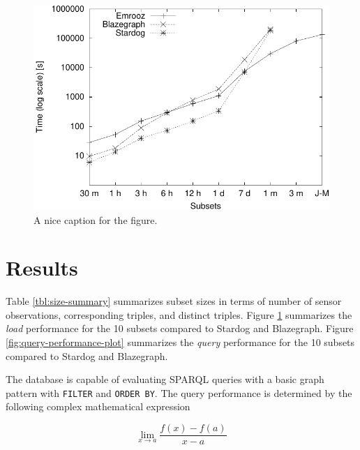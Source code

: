 \documentclass[preprint,12pt,authoryear]{elsarticle}
\begin{document}
\begin{figure}[!ht]
  \centering
  \includegraphics[scale=0.6]{load-performance-plot.pdf}
	\caption{A nice caption for the figure.}
	\label{fig:load-performance-plot}
\end{figure}

\section{Results}
\label{s:results}
Table \ref{tbl:size-summary} summarizes subset sizes in terms of number of sensor observations, corresponding triples, and distinct triples. Figure \ref{fig:load-performance-plot} summarizes the \emph{load} performance for the 10 subsets compared to Stardog and Blazegraph. Figure \ref{fig:query-performance-plot} summarizes the \emph{query} performance for the 10 subsets compared to Stardog and Blazegraph. 

The database is capable of evaluating SPARQL queries with a basic graph pattern with \texttt{FILTER} and \texttt{ORDER BY}. The query performance is determined by the following complex mathematical expression

\begin{displaymath}
\lim_{x \to a} \frac{f(x) - f(a)}{x - a}
\end{displaymath}
\end{document}

